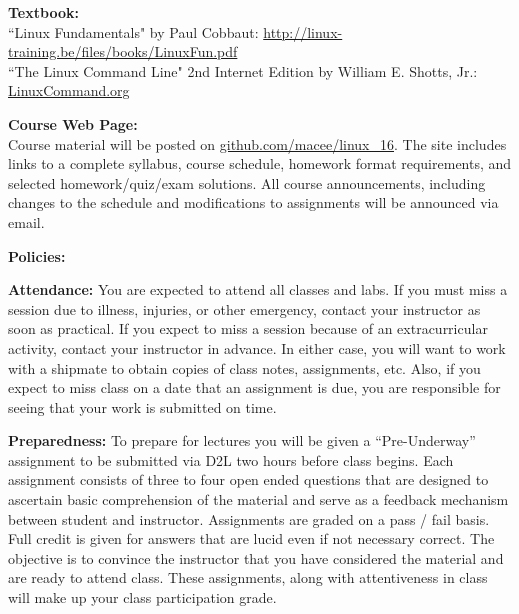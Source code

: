 \documentclass[12pt]{article}
\begin{document}
\vspace*{.15in}
\noindent\textbf{Textbook:}\\
``Linux Fundamentals" by Paul Cobbaut: \href{http://linux-training.be/files/books/LinuxFun.pdf}{http://linux-training.be/files/books/LinuxFun.pdf} \\
``The Linux Command Line" 2nd Internet Edition by William E. Shotts, Jr.: \href{LinuxCommand.org}{LinuxCommand.org}

\vspace*{.15in}


\vspace*{.15in}
\noindent\textbf{Course Web Page:}\\
Course material will be posted on \href{github.com/macee/linux\_16}{github.com/macee/linux\_16}. The site includes links to a complete syllabus, course schedule, homework format requirements, and selected homework/quiz/exam solutions.  All course announcements, including changes to the schedule and modifications to assignments will be announced via email.


\newpage



\vspace*{.15in}
\noindent\textbf{Policies:}

\vspace*{.15in}
\noindent\textbf{Attendance:} You are expected to attend all classes and labs. If you must miss a session due to illness, injuries, or other emergency, contact your instructor as soon as practical. If you expect to miss a session because of an extracurricular activity, contact your instructor in advance. In either case, you will want to work with a shipmate to obtain copies of class notes, assignments, etc. Also, if you expect to miss class on a date that an assignment is due, you are responsible for seeing that your work is submitted on time.

\vspace*{.15in}
\noindent\textbf{Preparedness:}  To prepare for lectures you will be given a “Pre-Underway” assignment to be submitted via D2L two hours before class begins. Each assignment consists of three to four open ended questions that are designed to ascertain basic comprehension of the material and serve as a feedback mechanism between student and instructor. Assignments are graded on a pass / fail basis. Full credit is given for answers that are lucid even if not necessary correct. The objective is to convince the instructor that you have considered the material and are ready to attend class. These assignments, along with attentiveness in class will make up your class participation grade.
\end{document}

